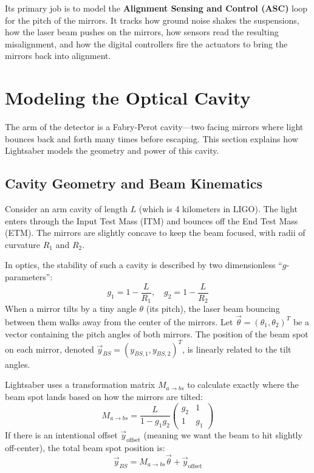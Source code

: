 \documentclass{article}
\begin{document}
Its primary job is to model the \textbf{Alignment Sensing and Control (ASC)} loop for the pitch of the mirrors. It tracks how ground noise shakes the suspensions, how the laser beam pushes on the mirrors, how sensors read the resulting misalignment, and how the digital controllers fire the actuators to bring the mirrors back into alignment.

\section{Modeling the Optical Cavity}
The arm of the detector is a Fabry-Perot cavity---two facing mirrors where light bounces back and forth many times before escaping. This section explains how Lightsaber models the geometry and power of this cavity.

\subsection{Cavity Geometry and Beam Kinematics}
Consider an arm cavity of length $L$ (which is 4 kilometers in LIGO). The light enters through the Input Test Mass (ITM) and bounces off the End Test Mass (ETM). The mirrors are slightly concave to keep the beam focused, with radii of curvature $R_1$ and $R_2$.

In optics, the stability of such a cavity is described by two dimensionless ``$g$-parameters'':
\begin{equation}
    g_1 = 1 - \frac{L}{R_1}, \quad g_2 = 1 - \frac{L}{R_2}
\end{equation}
When a mirror tilts by a tiny angle $\theta$ (its pitch), the laser beam bouncing between them walks away from the center of the mirrors. Let $\vec{\theta} = (\theta_1, \theta_2)^T$ be a vector containing the pitch angles of both mirrors. The position of the beam spot on each mirror, denoted $\vec{y}_{BS} = (y_{BS, 1}, y_{BS, 2})^T$, is linearly related to the tilt angles. 

Lightsaber uses a transformation matrix $M_{a \to bs}$ to calculate exactly where the beam spot lands based on how the mirrors are tilted:
\begin{equation}
    M_{a \to bs} = \frac{L}{1-g_1 g_2} \begin{pmatrix} g_2 & 1 \\ 1 & g_1 \end{pmatrix}
\end{equation}
If there is an intentional offset $\vec{y}_{\text{offset}}$ (meaning we want the beam to hit slightly off-center), the total beam spot position is:
\begin{equation}
    \vec{y}_{BS} = M_{a \to bs} \vec{\theta} + \vec{y}_{\text{offset}}
\end{equation}
\end{document}
